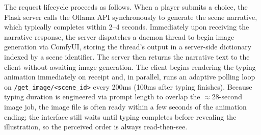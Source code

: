 \documentclass[12pt,a4paper]{article}
\newcommand{\breakablegetimage}[1]{\texttt{/get\_image/}\allowbreak\texttt{#1}}
\begin{document}
The request lifecycle proceeds as follows. When a player submits a choice, the Flask server calls the Ollama API synchronously to generate the scene narrative, which typically completes within 2--4 seconds. Immediately upon receiving the narrative response, the server dispatches a daemon thread to begin image generation via ComfyUI, storing the thread's output in a server-side dictionary indexed by a scene identifier. The server then returns the narrative text to the client without awaiting image generation. The client begins rendering the typing animation immediately on receipt and, in parallel, runs an adaptive polling loop on \breakablegetimage{<scene\_id>} every 200ms (100ms after typing finishes). Because typing duration is engineered via prompt length to overlap the $\approx$28-second image job, the image file is often ready within a few seconds of the animation ending; the interface still waits until typing completes before revealing the illustration, so the perceived order is always read-then-see.
\end{document}
